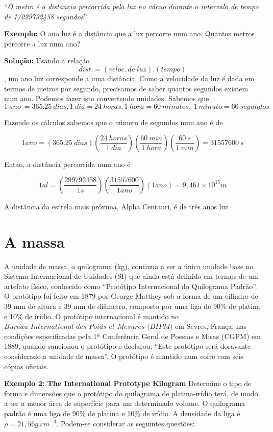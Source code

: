 \documentclass[
  portuguese,
  ]{book}
\begin{document}
``\emph{O metro é a distancia percorrida pela luz no vácuo durante o intervalo de tempo de 1/299792458 segundos}''

\textbf{Exemplo:} O ano luz é a distância que a luz percorre num ano. Quantos metros percorre a luz num ano?

\textbf{Solução:} Usando a relação \[dist. = (veloc. \ da\  luz) . (tempo)\], um ano luz corresponde a uma distância. Como a velocidade da luz é dada em termos de metros por segundo, precisamos de saber quantos segundos existem num ano. Podemos fazer isto convertendo unidades. Sabemos que
\[1\ ano\ = 365.25\ dias,1\ dia=24\ horas,1\ hora=60\ minutos,\ 1\ minuto=60\ segundos\]

Fazendo os cálculos sabemos que o número de segundos num ano é de

\[1ano=(365.25\ dias)(\frac{24\ horas}{1\ dia})(\frac{60\ min}{1\ hora})(\frac{60\ s}{1\ min})=31557600\ s\]

Entao, a distância percorrida num ano é

\[1al=(\frac{299792458}{1s})(\frac{31557600}{1ano})(1ano)=9,461\times10^{15}m\]

A distância da estrela mais próxima, Alpha Centauri, é de três anos luz

\hypertarget{a-massa}{%
\section{A massa}\label{a-massa}}

A unidade de massa, o quilograma (kg), continua a ser a única unidade base no Sistema Internacional de Unidades (SI) que ainda está definido em termos de um artefato físico, conhecido como ``Protótipo Internacional do Quilograma Padrão''. O protótipo foi feito em 1879 por George Matthey sob a forma de um cilindro de 39 mm de altura e 39 mm de diâmetro, composto por uma liga de 90\% de platina e 10\% de irídio. O protótipo internacional é mantido no \(\textit{Bureau International des Poids et Mesures (BIPM)}\) em Sevres, França, nas condições especificadas pela 1ª Conferência Geral de Poesias e Misas (CGPM) em 1889, quando sancionou o protótipo e declarou: ``Este protótipo será doravante considerado a unidade de massa''. O protótipo é mantido num cofre com seis cópias oficiais.

\textbf{Exemplo 2: The International Prototype Kilogram} Determine o tipo de forma e dimensões que o protótipo do quilograma de platina-irídio terá, de modo a ter a menor área de superfície para um determinado volume. O quilograma padrão é uma liga de 90\% de platina e 10\% de irídio. A densidade da liga é \(\rho = 21,56g.cm^{-3}\). Podem-se considerar as seguintes questões:
\end{document}

